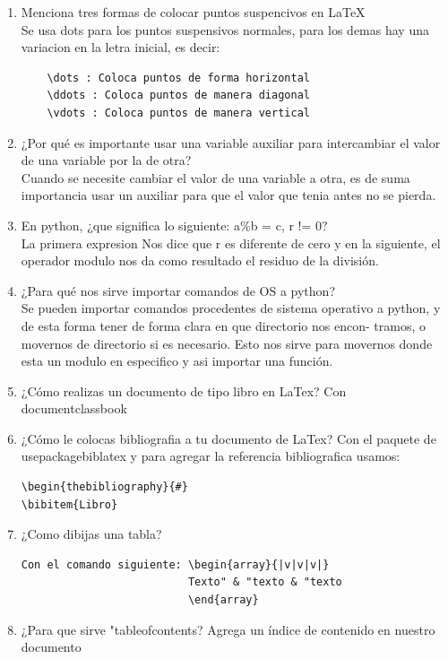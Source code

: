 \documentclass[letterpaper, 12pt, oneside]{article}%
\begin{document}
\begin{enumerate}
	\item Menciona tres formas de colocar puntos suspencivos en LaTeX\\
	Se usa dots para los puntos suspensivos normales, para los demas hay una variacion en la letra inicial, es decir:
\begin{verbatim} 
	\dots : Coloca puntos de forma horizontal
	\ddots : Coloca puntos de manera diagonal
	\vdots : Coloca puntos de manera vertical
\end{verbatim}	
	\item ¿Por qué es importante usar una variable auxiliar para intercambiar el valor de una variable por la de otra?\\
	Cuando se necesite cambiar el valor de una variable a otra, es
de suma importancia usar un auxiliar para que el valor que tenia
antes no se pierda.

	\item En python, ¿que significa lo siguiente: a\%b = c, r != 0?\\
La primera expresion Nos dice que r es diferente de cero y en la siguiente, el operador modulo nos da como resultado el residuo de la división.
	\item ¿Para qué nos sirve importar comandos de OS a python?\\
Se pueden importar comandos procedentes de sistema operativo a python, y
de esta forma tener de forma clara en que directorio nos encon-
tramos, o movernos de directorio si es necesario. Esto nos sirve
para movernos donde esta un modulo en especifico y asi importar
una función.
	\item ¿Cómo realizas un documento de tipo libro en LaTex?
	Con documentclass{book}
	\item ¿Cómo le colocas bibliografia a tu documento de LaTex?
	Con el paquete de usepackage{biblatex} y para agregar la referencia bibliografica usamos: \begin{verbatim}
\begin{thebibliography}{#}
\bibitem{Libro}
	\end{verbatim}
	\item ¿Como dibijas una tabla?
\begin{verbatim}
Con el comando siguiente: \begin{array}{|v|v|v|}
                          Texto" & "texto & "texto
                          \end{array}
\end{verbatim}
	\item ¿Para que sirve "tableofcontents?
	Agrega un índice de contenido en nuestro documento
	

\end{enumerate}
\end{document}
